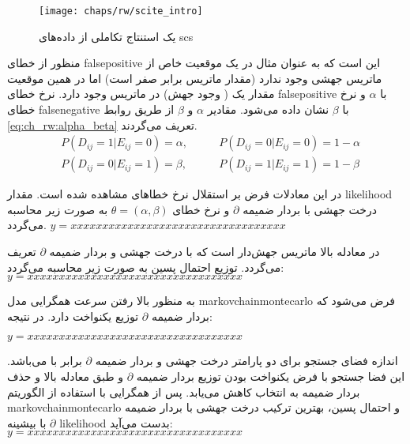 \begin{figure}[!ht]
	\centerline{\texttt{[image: chaps/rw/scite\_intro]}}
	\caption{یک استنتاج تکاملی از داده‌های \gls{scs} \cite{jahn2016tree}}
	\label{fig:ch_rw:scite_intro}
\end{figure}

منظور از خطای \gls{falsepositive} این است که به عنوان مثال در یک موقعیت خاص از ماتریس  جهشی وجود ندارد (مقدار ماتریس برابر صفر است) اما در همین موقعیت مقدار یک ( وجود جهش) در ماتریس  وجود دارد. نرخ خطای \gls{falsepositive} با  $\alpha$ و نرخ خطای \gls{falsenegative} با $\beta$ نشان داده می‌شود. مقادیر $\alpha$ و $\beta$ از طریق روابط \ref{eq:ch_rw:alpha_beta} تعریف می‌گردند.
\begin{equation}
	\begin{aligned}
		&P(D_{ij}=1|E_{ij}=0)=\alpha, &\qquad P(D_{ij}=0|E_{ij}=0)=1-\alpha \\ &P(D_{ij}=0|E_{ij}=1)=\beta, &\qquad P(D_{ij}=1|E_{ij}=1)=1-\beta
	\end{aligned}
	\label{eq:ch_rw:alpha_beta}
\end{equation}

 در این معادلات فرض بر استقلال نرخ خطاهای مشاهده شده است. مقدار \gls{likelihood} درخت جهشی  با بردار ضمیمه $\partial$ و نرخ خطای $\theta = (\alpha, \beta)$ به صورت زیر محاسبه می‌گردد. 
 \begin{math}
 	y=xxxxxxxxxxxxxxxxxxxxxxxxxxxxxxxxxx
 \end{math}
 
 در معادله بالا  ماتریس جهش‌دار است که با درخت جهشی  و بردار ضمیمه $\partial$  تعریف می‌گردد. توزیع احتمال پسین به صورت زیر محاسبه می‌گردد: 
 \begin{math}
	y=xxxxxxxxxxxxxxxxxxxxxxxxxxxxxxxxxx
\end{math}

به منظور بالا رفتن سرعت همگرایی مدل \gls{markovchainmontecarlo} فرض می‌شود که بردار ضمیمه $\partial$ توزیع یکنواخت دارد. در نتیجه: 

 \begin{math}
	y=xxxxxxxxxxxxxxxxxxxxxxxxxxxxxxxxxx
\end{math}


اندازه فضای جستجو برای دو پارامتر درخت جهشی  و بردار ضمیمه $\partial$ برابر با  می‌باشد. این فضا جستجو با فرض یکنواخت بودن توزیع بردار ضمیمه $\partial$ و طبق معادله بالا و حذف بردار ضمیمه به  انتخاب کاهش می‌یابد. پس از همگرایی با استفاده از الگوریتم \gls{markovchainmontecarlo} و احتمال پسین، بهترین ترکیب درخت جهشی  با بردار ضمیمه $\partial$ با بیشینه \gls{likelihood} بدست می‌آید: 
 \begin{math}
	y=xxxxxxxxxxxxxxxxxxxxxxxxxxxxxxxxxx
\end{math}

